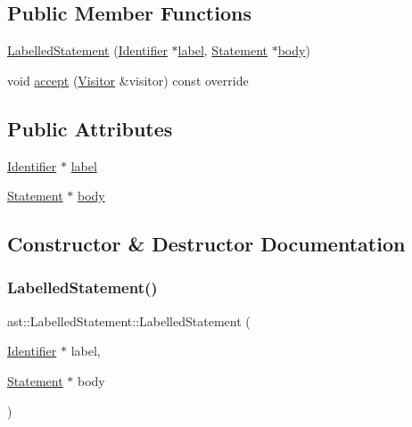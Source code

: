 \subsection*{Public Member Functions}
\begin{DoxyCompactItemize}
\item 
\hyperlink{structast_1_1_labelled_statement_acf068a488f431e0cccbeef1e000357fb}{Labelled\+Statement} (\hyperlink{structast_1_1_identifier}{Identifier} $\ast$\hyperlink{structast_1_1_labelled_statement_a7e09871f58c37264bcd2a778f7c6ab50}{label}, \hyperlink{structast_1_1_statement}{Statement} $\ast$\hyperlink{structast_1_1_labelled_statement_a235fcc267aa2fe36d6f224a5935e1398}{body})
\item 
void \hyperlink{structast_1_1_labelled_statement_ad47515643d78baba052d18301b134f69}{accept} (\hyperlink{structast_1_1_visitor}{Visitor} \&visitor) const override
\end{DoxyCompactItemize}
\subsection*{Public Attributes}
\begin{DoxyCompactItemize}
\item 
\hyperlink{structast_1_1_identifier}{Identifier} $\ast$ \hyperlink{structast_1_1_labelled_statement_a7e09871f58c37264bcd2a778f7c6ab50}{label}
\item 
\hyperlink{structast_1_1_statement}{Statement} $\ast$ \hyperlink{structast_1_1_labelled_statement_a235fcc267aa2fe36d6f224a5935e1398}{body}
\end{DoxyCompactItemize}


\subsection{Constructor \& Destructor Documentation}
\mbox{\label{structast_1_1_labelled_statement_acf068a488f431e0cccbeef1e000357fb}} 
\subsubsection{\texorpdfstring{Labelled\+Statement()}{LabelledStatement()}}
{\footnotesize\ttfamily ast\+::\+Labelled\+Statement\+::\+Labelled\+Statement (\begin{DoxyParamCaption}\item[{\hyperlink{structast_1_1_identifier}{Identifier} $\ast$}]{label,  }\item[{\hyperlink{structast_1_1_statement}{Statement} $\ast$}]{body }\end{DoxyParamCaption})\hspace{0.3cm}{\ttfamily [inline]}}



